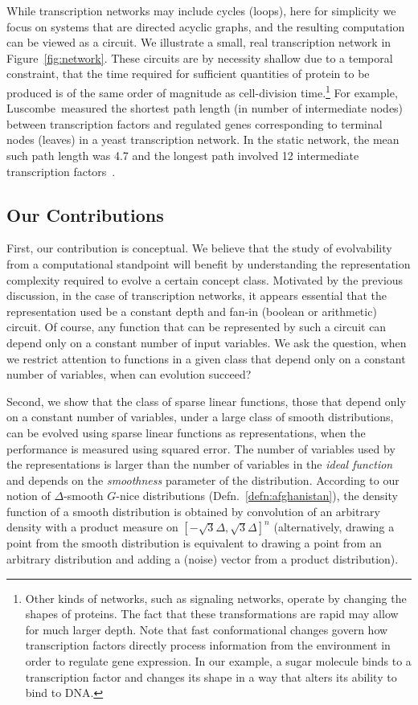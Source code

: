\documentclass[11pt]{article}
\begin{document}
While transcription networks may include cycles (loops), here for simplicity we
focus on systems that are directed acyclic graphs, and the resulting computation
can be viewed as a circuit. We illustrate a small, real transcription network in
Figure~\ref{fig:network}. These circuits are by necessity shallow due to
a temporal constraint, that the time required for sufficient quantities of
protein to be produced is of the same order of magnitude as cell-division
time.\footnote{Other kinds of networks, such as signaling networks, operate by
changing the shapes of proteins. The fact that these transformations are rapid
may allow for much larger depth. Note that fast conformational changes govern
how transcription factors directly process information from the environment in
order to regulate gene expression.  In our example, a sugar molecule binds to a
transcription factor and changes its shape in a way that alters its ability to
bind to DNA.} For example, Luscombe~\etal measured the shortest path length (in
number of intermediate nodes) between transcription factors and regulated genes
corresponding to terminal nodes (leaves) in a yeast transcription network. In
the static network, the mean such path length was 4.7 and the longest path
involved 12 intermediate transcription factors~\cite{Luscombe:2004}.

\subsection{Our Contributions}

First, our contribution is conceptual. We believe that the study of evolvability
from a computational standpoint will benefit by understanding the representation
complexity required to evolve a certain concept class. Motivated by the previous
discussion, in the case of transcription networks, it appears essential that the
representation used be a constant depth and fan-in (boolean or arithmetic)
circuit. Of course, any function that can be represented by such a circuit can
depend only on a constant number of input variables. We ask the
question, when we restrict attention to functions in a given class that depend
only on a constant number of variables, when can evolution succeed?

Second, we show that the class of sparse linear functions, those that depend
only on a constant number of variables, under a large class of smooth
distributions, can be evolved using sparse linear functions as representations,
when the performance is measured using squared error. The number of variables
used by the representations is larger than the number of variables in the
\emph{ideal function} and depends on the \emph{smoothness} parameter of the
distribution. According to our notion of $\Delta$-smooth $G$-nice distributions
(Defn.~\ref{defn:afghanistan}), the density function of a smooth distribution
is obtained by convolution of an arbitrary density with a product measure on
$[-\sqrt{3}\Delta, \sqrt{3}\Delta]^n$ (alternatively, drawing a point from the
smooth distribution is equivalent to drawing a point from an arbitrary
distribution and adding a (noise) vector from a product distribution). 
\end{document}
